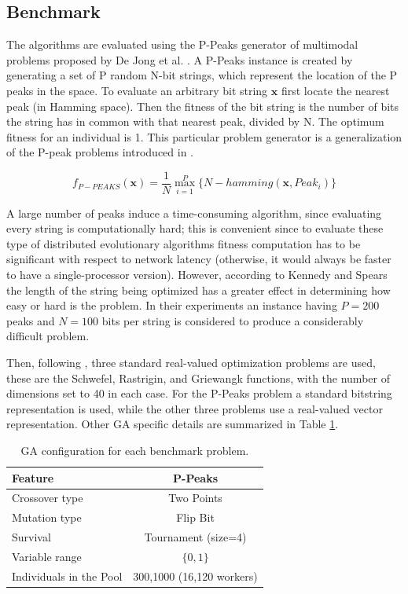 \documentclass{sig-alternate}
\begin{document}
\subsection{Benchmark}
\label{ss:benchmark}
The algorithms are evaluated using the P-Peaks generator of multimodal problems proposed by De Jong et al. \cite{Jong:PS97}.
A P-Peaks instance is created by generating a set of P random N-bit
strings, which represent the location of the P peaks in the space. To
evaluate an arbitrary bit string \begin{math} \mathbf{x} \end{math}
first locate the nearest peak (in Hamming space). Then the fitness of
the bit string is the number of bits the string has in common with
that nearest peak, divided by N. The optimum fitness for an individual
is 1. This particular problem generator is a generalization of the
P-peak problems introduced in \cite{Jong:1990}.            

\begin{equation}
f_{P-PEAKS}(\mathbf{x})=\frac{1}{N} \overset{P}{\max_{i=1}} \{N-hamming(\mathbf{x},Peak_i)   \}
\end{equation}

A large number of peaks induce a time-consuming algorithm,
since evaluating every string is computationally hard; this is
convenient since to evaluate these type of distributed evolutionary
algorithms fitness computation has to be significant with respect to
network latency (otherwise, it would always be faster to have a
single-processor version).
However, according to Kennedy and Spears \cite{Kennedy:1998ch} the length of
the string being optimized has a greater effect in determining how
easy or hard is the problem. In their experiments an instance having $P = 200$ peaks
and $N = 100$ bits per string is considered to produce a considerably difficult problem.

Then, following \cite{fuku1}, three standard real-valued optimization problems are used,
these are the Schwefel, Rastrigin, and Griewangk functions, with the number of dimensions set to
40 in each case. 
For the P-Peaks problem a standard bitstring representation is used, while the other three problems use a real-valued
vector representation.
Other GA specific details are summarized in Table \ref{tab:ga}.

\begin{table}[!t]
\caption{GA configuration for each benchmark problem.}
\label{tab:ga}
\centering
\begin{tabular}{|l|c|}
\hline
\textbf{Feature} & \textbf{P-Peaks}  \\
\hline
\hline
Crossover type & Two Points  \\
Mutation type & Flip Bit \\
Survival & Tournament (size=4) \\
Variable range & $\{0,1\}$  \\
Individuals in the Pool & 300,1000  (16,120 workers) \\
\hline
\end{tabular}
\end{table}
\end{document}
